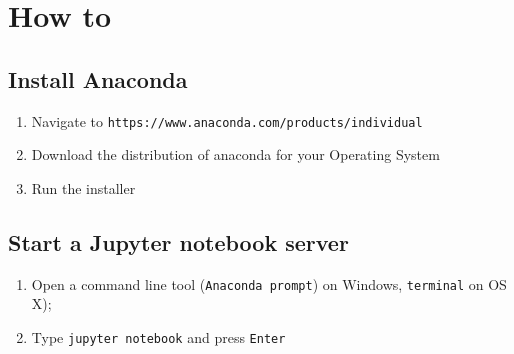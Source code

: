 \section{How to}

\subsection{Install Anaconda}

\begin{enumerate}

\item 

Navigate to \texttt{https://www.anaconda.com/products/individual}

\item 

Download the distribution of anaconda for your Operating System

\item 

Run the installer

\end{enumerate}


\subsection{Start a Jupyter notebook server}


\begin{enumerate}

\item 

    Open a command line tool (\texttt{Anaconda prompt}) on Windows,
        \texttt{terminal} on OS X);

\item 

    Type \texttt{jupyter notebook} and press \texttt{Enter}

\end{enumerate}


